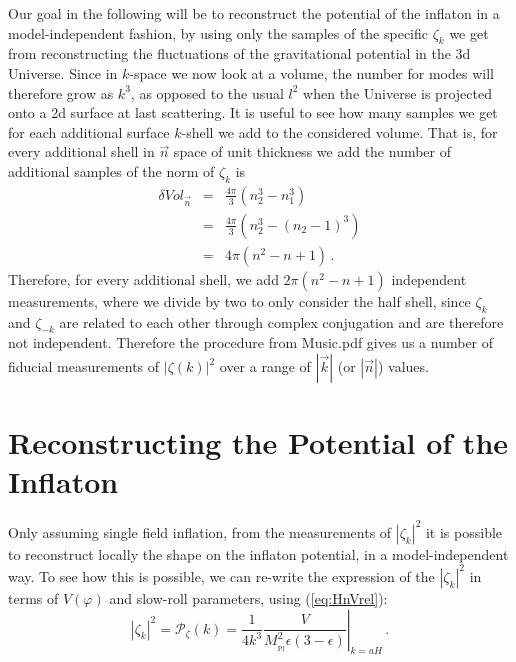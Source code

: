 \documentclass[prd, onecolumn, floatfix, letterpaper, nofootinbib, amsmath, amssymb, superscriptaddress]{revtex4}
\renewcommand{\(}{\left(}
\renewcommand{\)}{\right)}
\renewcommand{\[}{\left[}
\renewcommand{\]}{\right]}
\def\be{\begin{equation}}
\def\ee{\end{equation}}
\def\bea{\begin{eqnarray}}
\def\eea{\end{eqnarray}}
\newcommand{\Mp}{M_{_\mathrm{Pl}}}
\begin{document}
 
 Our goal in the following will be to reconstruct the potential of the inflaton in a model-independent fashion, by using only the samples of the specific $\zeta_k$ we get from reconstructing the fluctuations of the gravitational potential in the 3d Universe. Since in $k$-space we now look at a volume, the number for modes will therefore grow as $k^3$, as opposed to the usual $l^2$ when the Universe is projected onto a 2d surface at last scattering. It is useful to see how many samples we get for each additional surface $k$-shell we add to the considered volume. That is, for every additional shell in $\vec{n}$ space of unit thickness we add the number of additional samples of the norm of $\zeta_k$ is
 \bea
 	\delta Vol_{\vec{n}}&=&\frac{4\pi}{3}\left(n_2^3-n_1^3 \right)\\
	&=&\frac{4\pi}{3}\left(n_2^3-(n_2-1)^3 \right)\\
	&=&4\pi(n^2-n+1)\, .
 \eea
Therefore, for every additional shell, we add $2\pi(n^2-n+1)$ independent measurements, where we divide by two to only consider the half shell, since $\zeta_k$ and $\zeta_{-k}$ are related to each other through complex conjugation and are therefore not independent. Therefore the procedure from Music.pdf gives us a number of fiducial measurements of $|\zeta(k)|^2$ over a range of $|\vec{k}|$ (or $|\vec{n}|$) values.
 
 
 \section{Reconstructing the Potential of the Inflaton}
 
 Only assuming single field inflation, from the measurements of $|\zeta_k|^2$ it is possible to reconstruct locally the shape on the inflaton potential, in a model-independent way. To see how this is possible, we can re-write the expression of the $|\zeta_k|^2$ in terms of $V(\varphi)$ and slow-roll parameters, using (\ref{eq:HnVrel}): 
\be
\label{eq:PfctVnepsilon}
	|\zeta_k|^2=\mathcal{P}_\zeta(k)=\left.\frac{1}{4k^{3}}\frac{V}{\Mp^2\epsilon(3-\epsilon)}\right|_{k=aH}\, .
\ee
 
\end{document}
